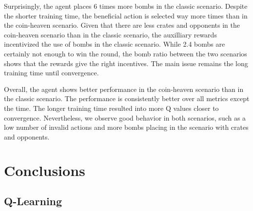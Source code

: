 \documentclass[
	letterpaper, %
	12pt, %
]{CSUniSchoolLabReport}
\begin{document}
Surprisingly, the agent places 6 times more bombs in the classic scenario. Despite the shorter training time,
the beneficial action is selected way more times than in the coin-heaven scenario. Given that there are less
crates and opponents in the coin-heaven scenario than in the classic scenario, the auxilliary rewards incentivized
the use of bombs in the classic scenario. While 2.4 bombs are certainly not enough to win the round,
the bomb ratio between the two scenarios shows that the rewards give the right incentives. The main issue remains
the long training time until convergence.


Overall, the agent shows better performance in the coin-heaven scenario than in
the classic scenario. The performance is consistently better over all metrics except the time.
The longer training time resulted into more Q values closer to convergence. Nevertheless,
we observe good behavior in both scenarios, such as a low number of invalid actions and more bombs placing in
the scenario with crates and opponents.



\section{Conclusions}


\subsection*{Q-Learning}



\printbibliography %

\end{document}
